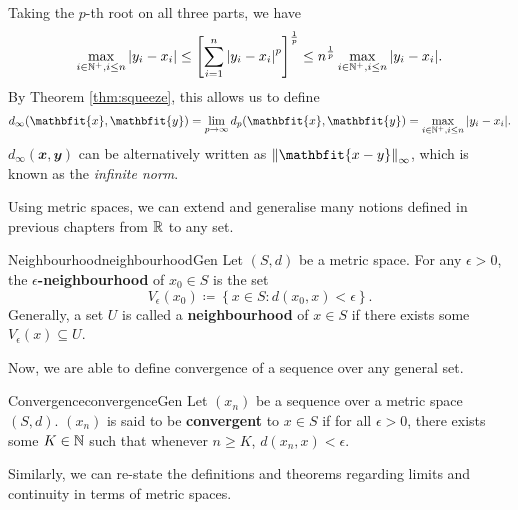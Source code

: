 \documentclass[math]{amznotes}
\theoremstyle{remark}
\begin{document}
Taking the $p$-th root on all three parts, we have
\begin{equation*}
    \max_{i \in \mathbb{N}^+, i \leq n}{\left\lvert {y_i - x_i} \right\rvert} \leq \left[\sum_{i = 1}^{n}{\left\lvert {y_i - x_i} \right\rvert}^p\right]^{\frac{1}{p}} \leq n^{\frac{1}{p}}\max_{i \in \mathbb{N}^+, i \leq n}{\left\lvert {y_i - x_i} \right\rvert}.
\end{equation*}
By Theorem \ref{thm:squeeze}, this allows us to define
\begin{equation*}
    d_\infty(\mathbfit{x}, \mathbfit{y}) = \lim_{p \to \infty}d_p(\mathbfit{x}, \mathbfit{y}) = \max_{i \in \N^+, i \leq n}\abs{y_i - x_i}.
\end{equation*}
$d_\infty(\mathbfit{x}, \mathbfit{y})$ can be alternatively written as $\norm{\mathbfit{x - y}}_\infty$, which is known as the \textit{infinite norm}.

Using metric spaces, we can extend and generalise many notions defined in previous chapters from $\mathbb{R}$ to any set.
\begin{dfnbox}{Neighbourhood}{neighbourhoodGen}
    Let $(S, d)$ be a metric space. For any $\epsilon > 0$, the {\color{red} \textbf{$\epsilon$-neighbourhood}} of $x_0 \in S$ is the set
    \begin{equation*}
        V_\epsilon(x_0) \coloneqq \left\{x \in S \colon d(x_0, x) < \epsilon\right\}.
    \end{equation*}
    Generally, a set $U$ is called a {\color{red} \textbf{neighbourhood}} of $x \in S$ if there exists some $V_\epsilon(x) \subseteq U$.
\end{dfnbox}
Now, we are able to define convergence of a sequence over any general set.
\begin{dfnbox}{Convergence}{convergenceGen}
    Let $(x_n)$ be a sequence over a metric space $(S, d)$. $(x_n)$ is said to be {\color{red} \textbf{convergent}} to $x \in S$ if for all $\epsilon > 0$, there exists some $K \in \mathbb{N}$ such that whenever $n \geq K$, $d(x_n, x) < \epsilon$.
\end{dfnbox}
Similarly, we can re-state the definitions and theorems regarding limits and continuity in terms of metric spaces.
\end{document}
